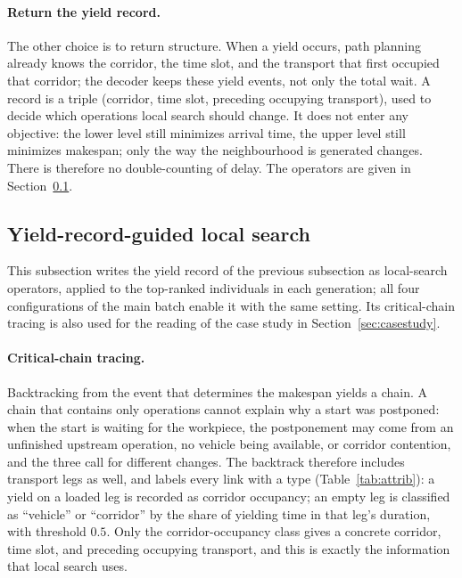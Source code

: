\paragraph{Return the yield record.}
The other choice is to return structure. When a yield occurs, path planning already knows the corridor, the time slot, and the transport that first occupied that corridor; the decoder keeps these yield events, not only the total wait.
A record is a triple (corridor, time slot, preceding occupying transport), used to decide which operations local search should change.
It does not enter any objective: the lower level still minimizes arrival time, the upper level still minimizes makespan; only the way the neighbourhood is generated changes.
There is therefore no double-counting of delay. The operators are given in Section~\ref{sec:ls}.

\subsection{Yield-record-guided local search}
\label{sec:ls}
This subsection writes the yield record of the previous subsection as local-search operators, applied to the top-ranked individuals in each generation; all four configurations of the main batch enable it with the same setting. Its critical-chain tracing is also used for the reading of the case study in Section~\ref{sec:casestudy}.

\paragraph{Critical-chain tracing.}
Backtracking from the event that determines the makespan yields a chain. A chain that contains only operations cannot explain why a start was postponed: when the start is waiting for the workpiece, the postponement may come from an unfinished upstream operation, no vehicle being available, or corridor contention, and the three call for different changes.
The backtrack therefore includes transport legs as well, and labels every link with a type (Table~\ref{tab:attrib}): a yield on a loaded leg is recorded as corridor occupancy; an empty leg is classified as ``vehicle'' or ``corridor'' by the share of yielding time in that leg's duration, with threshold $0.5$.
Only the corridor-occupancy class gives a concrete corridor, time slot, and preceding occupying transport, and this is exactly the information that local search uses.

